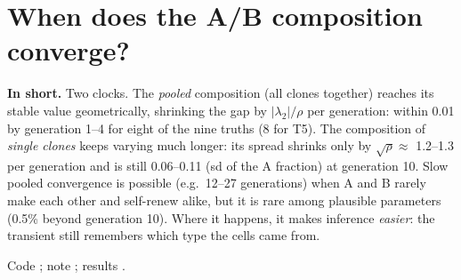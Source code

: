 \documentclass[10pt,a4paper]{article}
\begin{document}
\section{When does the A/B composition converge?}\label{sec:convergence}
\begin{keybox}
\textbf{In short.} Two clocks. The \emph{pooled} composition (all clones together) reaches its stable value geometrically, shrinking the gap by $|\lambda_2|/\rho$ per generation: within 0.01 by generation 1--4 for eight of the nine truths (8 for T5). The composition of \emph{single clones} keeps varying much longer: its spread shrinks only by $\sqrt\rho \approx$ 1.2--1.3 per generation and is still 0.06--0.11 (sd of the A fraction) at generation 10. Slow pooled convergence is possible (e.g.\ 12--27 generations) when A and B rarely make each other and self-renew alike, but it is rare among plausible parameters (0.5\% beyond generation 10). Where it happens, it makes inference \emph{easier}: the transient still remembers which type the cells came from.
\end{keybox}
Code ; note ; results .
\end{document}
